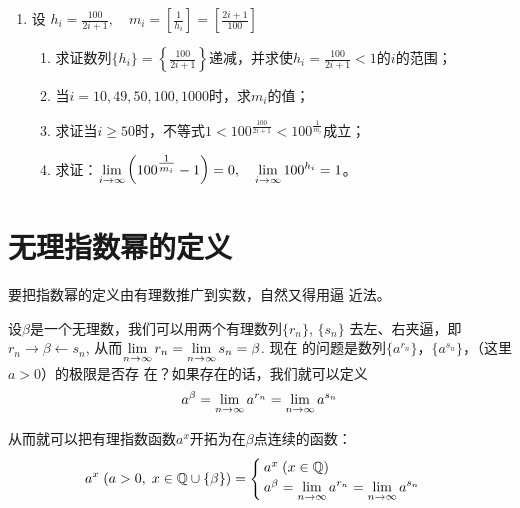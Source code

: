\begin{enumerate}
\item  设 $h_{i}=\frac{100}{2 i+1},\quad  m_{i}=\left[\frac{1}{h_{i}}\right]=\left[\frac{2 i+1}{100}\right]$
\begin{enumerate}
  \item 求证数列$\{h_i\}=\left\{\frac{100}{2 i+1}\right\}$递减，并求使$h_i=\frac{100}{2i+1}<1$的$i$的范围；
  \item 当$i=10,49,50,100,1000$时，求$m_i$的值；
  \item 求证当$i\ge 50$时，不等式$1<100^{\tfrac{100}{2i+1}}<100^{\tfrac{1}{m_i}}$成立；
  \item 求证：$\displaystyle\lim_{i\to\infty}\left(100^{\tfrac{1}{m_i}}-1\right)=0,\quad \displaystyle\lim_{i\to\infty}100^{h_i}=1$。
\end{enumerate}
\end{enumerate}

\section{无理指数幂的定义}
要把指数幂的定义由有理数推广到实数，自然又得用逼
近法。

设$\beta$是一个无理数，我们可以用两个有理数列$\{r_n\}$, $\{s_n\}$
去左、右夹逼，即$r_n\to \beta\leftarrow s_n$, 从而$\displaystyle\lim_{n\to\infty}r_n=\displaystyle\lim_{n\to\infty}s_n=\beta$. 现在
的问题是数列$\{a^{r_n}\}$，$\{a^{s_n}\}$，（这里$a>0$）的极限是否存
在？如果存在的话，我们就可以定义
\[a^{\beta}=\displaystyle\lim_{n\to\infty}a^{r_n}=\displaystyle\lim_{n\to\infty}a^{s_n}\]

从而就可以把有理指数函数$a^x$开拓为在$\beta$点连续的函数：
\[a^x\; (a>0,\; x\in \mathbb{Q}\cup\{\beta\})=\begin{cases}
  a^x\;  (x\in\mathbb{Q})\\
  a^{\beta}=\displaystyle\lim_{n\to\infty}a^{r_n}=\displaystyle\lim_{n\to\infty}a^{s_n}
\end{cases}\]

\begin{example}
    
\end{example}

\begin{solution}
    
\end{solution}


\begin{example}
    
\end{example}

\begin{solution}
    
\end{solution}


